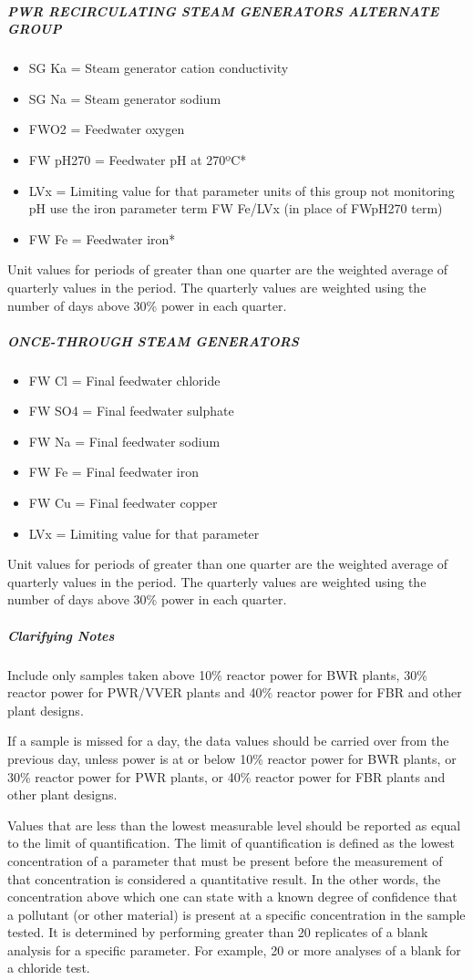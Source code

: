 \begin{itemize}
\subparagraph{PWR RECIRCULATING STEAM GENERATORS ALTERNATE GROUP}
\begin{itemize}
\item SG Ka		=	Steam generator cation conductivity
\item SG Na		=	Steam generator sodium
\item FWO2		=	Feedwater oxygen
\item FW pH270 	=	Feedwater pH at 270ºC*
\item LVx		=	Limiting value for that parameter
units of this group not monitoring pH use the iron parameter term FW Fe/LVx (in place of FWpH270 term)
\item FW Fe		=	Feedwater iron*
\end{itemize}

Unit values for periods of greater than one quarter are the weighted
average of quarterly values in the period. The quarterly values are
weighted using the number of days above 30\% power in each quarter.

\subparagraph{ONCE-THROUGH STEAM GENERATORS}
\begin{itemize}
\item FW Cl		=	Final feedwater chloride
\item FW SO4		=	Final feedwater sulphate
\item FW Na		=	Final feedwater sodium
\item FW Fe		=	Final feedwater iron
\item FW Cu		=	Final feedwater copper
\item LVx		=	Limiting value for that parameter
\end{itemize}

Unit values for periods of greater than one quarter are the weighted
average of quarterly values in the period. The quarterly values are
weighted using the number of days above 30\% power in each quarter.
\end{itemize}

\subparagraph{Clarifying Notes}
Include only samples taken above 10\% reactor power for BWR plants,
30\% reactor power for PWR/VVER plants and 40\% reactor power for FBR
and other plant designs.

If a sample is missed for a day, the data values should be carried
over from the previous day, unless power is at or below 10\% reactor
power for BWR plants, or 30\% reactor power for PWR plants, or 40\%
reactor power for FBR plants and other plant designs.

Values that are less than the lowest measurable level should be
reported as equal to the limit of quantification. The limit of
quantification is defined as the lowest concentration of a parameter
that must be present before the measurement of that concentration is
considered a quantitative result. In the other words, the
concentration above which one can state with a known degree of
confidence that a pollutant (or other material) is present at a
specific concentration in the sample tested. It is determined by
performing greater than 20 replicates of a blank analysis for a
specific parameter. For example, 20 or more analyses of a blank for a
chloride test.

